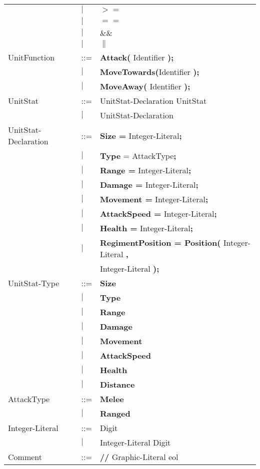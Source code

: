 \begin{center}
\begin{longtable}{l l l}
							&$\mid$	&$\boldsymbol {>=}$\\
							&$\mid$	&$\boldsymbol {==}$\\
							&$\mid$	&$\boldsymbol {\&\&}$\\
							&$\mid$	&$\boldsymbol {\|}$\\
UnitFunction				&	::=	&{\bf Attack(} Identifier {\bf );} \\
							&$\mid$	&{\bf MoveTowards(}Identifier {\bf );} \\
							&$\mid$	&{\bf MoveAway(} Identifier {\bf );} \\
UnitStat					&	::=	&UnitStat-Declaration UnitStat \\
							&$\mid$	&UnitStat-Declaration \\
UnitStat-Declaration		&	::=	&{\bf Size =} Integer-Literal{\bf ;} \\
							&$\mid$	&{\bf Type} = AttackType{\bf ;}\\
							&$\mid$	&{\bf  Range =} Integer-Literal{\bf;}\\
							&$\mid$	&{\bf Damage =} Integer-Literal{\bf ;}\\
							&$\mid$	&{\bf Movement = }Integer-Literal{\bf ;} \\				  
							&$\mid$	&{\bf AttackSpeed = }Integer-Literal{\bf ;} \\				  
							&$\mid$	&{\bf Health = }Integer-Literal{\bf ;} \\				  
							&$\mid$	& {\bf RegimentPosition = Position(} Integer-Literal {\bf ,}\\
							&		& Integer-Literal {\bf );}\\
UnitStat-Type				&	::=	&{\bf Size}\\
							&$\mid$	&{\bf Type}\\
							&$\mid$	&{\bf Range}\\
							&$\mid$	&{\bf Damage}\\
							&$\mid$	&{\bf Movement}\\
							&$\mid$	&{\bf AttackSpeed}\\
							&$\mid$	&{\bf Health}\\
							&$\mid$	&{\bf Distance}\\
AttackType					&	::=	&{\bf Melee}\\
							&$\mid$	&{\bf Ranged}\\
Integer-Literal				&	::=	&Digit\\
							&$\mid$	&Integer-Literal Digit\\
Comment						&	::=	&{\bf //} Graphic-Literal eol\\

\end{longtable}
\end{center}
